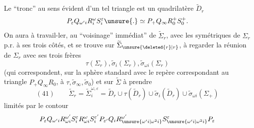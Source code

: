 {}
Le ``tronc''  au sens évident d'un tel triangle est un quadrilatère $\widetilde D_r$
\[
P_\varepsilon Q_{\omega'i}R_i^\omega S_i^\varepsilon\unsure{.}\simeq P_+Q_\infty R_0^+S_0^+.
\]
On aura à travail-\linebreak ler, au ``voisinage'' immédiat'' de     $\widetilde\Sigma_r$, avec les symétriques de $\Sigma_r$ p.r. à ses trois côtés, et se trouve sur $\widetilde\Sigma_{\unsure{\deleted{r}|r}}$,   à regarder la réunion de $\Sigma_r$ avec ses trois frères
\[
\tau(\Sigma_r),\widetilde\sigma_i(\Sigma_r),\widetilde\sigma_{\omega i}(\Sigma_r)
\]
(qui  correspondent, sur la sphère standard avec le repère correspondant au triangle $P_+Q_\infty R_0$, à $\tau,\widetilde\sigma_\infty,\widetilde\sigma_0$) et sur $\widetilde\Sigma$ à prendre
\[
(41)\qquad\widetilde\Sigma_r=\widetilde\Sigma_i^{\omega,\varepsilon}=\widetilde D_r\cup\tau(\widetilde D_r)\cup\widetilde\sigma_i(\widetilde D_r)\cup\widetilde\sigma_{\omega i}(\Sigma_+)
\]
limités par le contour
\[
P_\varepsilon Q_{\omega'i}R_{\omega i}^{\omega'}S_i^\varepsilon R_{\omega i}^\omega S_i^{\varepsilon'}P_{\varepsilon'}Q_iR_{\unsure{\omega'i|\omega^2i}}^{\omega'}S_{\unsure{\omega'i|\omega^2i}}^\varepsilon P_\varepsilon
\]

